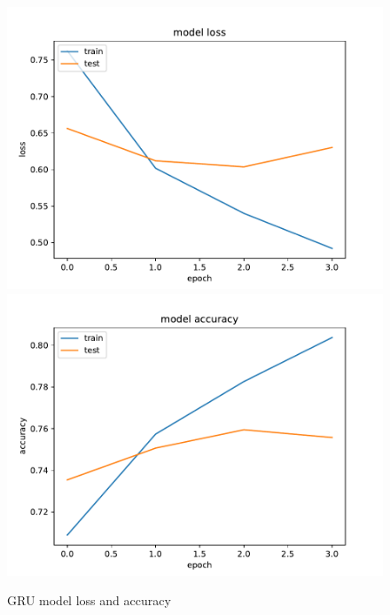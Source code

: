 \documentclass[12pt]{article}
\begin{document}
\begin{figure}[h!]
    \centering
    \includegraphics{gru_loss.pdf}
    \includegraphics{gru_accuracy.pdf}
    \caption{GRU model loss and accuracy}
    \label{fig:gru}
\end{figure}
\end{document}
